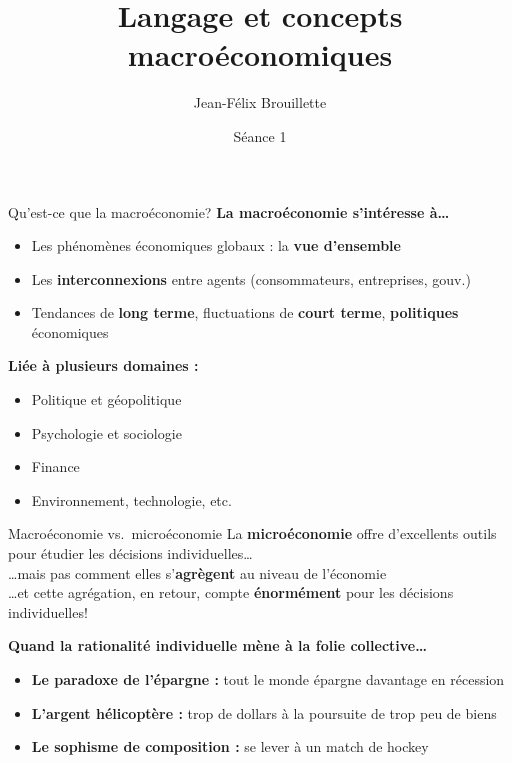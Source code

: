 \documentclass[aspectratio=169]{beamer}
\title{Langage et concepts macro\'economiques}
\author{Jean-F\'elix Brouillette}
\date{S\'eance 1}
\begin{document}
\titleframe

\begin{frame}{Qu'est-ce que la macro\'economie?}
   \textbf{La macro\'economie s'int\'eresse \`a\ldots}
   \vspace{0.15cm}
   \begin{itemize}
      \setlength\itemsep{0.2cm}
      \item Les ph\'enom\`enes \'economiques globaux : la \textbf{vue d'ensemble}
      \item Les \textbf{interconnexions} entre agents (consommateurs, entreprises, gouv.)
      \item Tendances de \textbf{long terme}, fluctuations de \textbf{court terme}, \textbf{politiques} \'economiques
   \end{itemize}
   \vspace{0.4cm}
   \textbf{Li\'ee \`a plusieurs domaines :}
   \vspace{0.15cm}
   \begin{itemize}
      \setlength\itemsep{0.15cm}
      \item Politique et g\'eopolitique
      \item Psychologie et sociologie
      \item Finance
      \item Environnement, technologie, etc.
   \end{itemize}
\end{frame}

\begin{frame}{Macro\'economie vs.\ micro\'economie}
   La \textbf{micro\'economie} offre d'excellents outils pour \'etudier les d\'ecisions individuelles\ldots
   \\[6pt]
   \ldots mais pas comment elles s'\textbf{agr\`egent} au niveau de l'\'economie
   \\[6pt]
   \ldots et cette agr\'egation, en retour, compte \textbf{\'enorm\'ement} pour les d\'ecisions individuelles!
   \vspace{0.5cm}

   \textbf{Quand la rationalit\'e individuelle m\`ene \`a la folie collective\ldots}
   \vspace{0.2cm}
   \begin{itemize}
      \setlength\itemsep{0.2cm}
      \item \textbf{Le paradoxe de l'\'epargne :} tout le monde \'epargne davantage en r\'ecession
      \item \textbf{L'argent h\'elicopt\`ere :} trop de dollars \`a la poursuite de trop peu de biens
      \item \textbf{Le sophisme de composition :} se lever \`a un match de hockey
   \end{itemize}
\end{frame}
\end{document}
